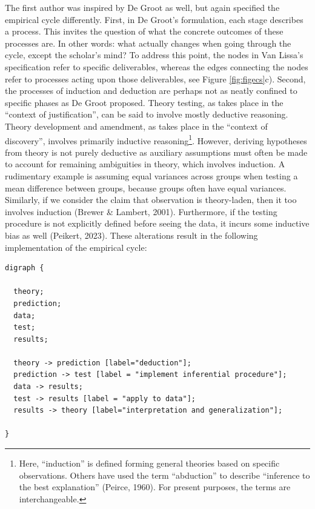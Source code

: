 \documentclass[
  man, noextraspace,floatsintext]{apa7}
\begin{document}
The first author was inspired by De Groot as well,
but again specified the empirical cycle differently.
First, in De Groot's formulation, each stage describes a process.
This invites the question of what the concrete outcomes of these processes are.
In other words: what actually changes when going through the cycle, except the scholar's mind?
To address this point, the nodes in Van Lissa's specification refer to specific deliverables, whereas the edges connecting the nodes refer to processes acting upon those deliverables, see Figure \ref{fig:figecs}c).
Second, the processes of induction and deduction are perhaps not as neatly confined to specific phases as De Groot proposed.
Theory testing, as takes place in the ``context of justification'', can be said to involve mostly deductive reasoning.
Theory development and amendment, as takes place in the ``context of discovery'', involves primarily inductive reasoning\footnote{Here, ``induction'' is defined forming general theories based on specific observations. Others have used the term ``abduction'' to describe ``inference to the best explanation'' (Peirce, 1960). For present purposes, the terms are interchangeable.}.
However, deriving hypotheses from theory is not purely deductive
as auxiliary assumptions must often be made to account for remaining ambiguities in theory, which involves induction.
A rudimentary example is assuming equal variances across groups when testing a mean difference between groups, because groups often have equal variances.
Similarly, if we consider the claim that observation is theory-laden, then it too involves induction (Brewer \& Lambert, 2001).
Furthermore, if the testing procedure is not explicitly defined before seeing the data, it incurs some inductive bias as well (Peikert, 2023).
These alterations result in the following implementation of the empirical cycle:

\begin{verbatim}
digraph {

  theory;
  prediction;
  data;
  test;
  results;
  
  theory -> prediction [label="deduction"];
  prediction -> test [label = "implement inferential procedure"];
  data -> results;
  test -> results [label = "apply to data"];
  results -> theory [label="interpretation and generalization"];

}
\end{verbatim}
\end{document}
